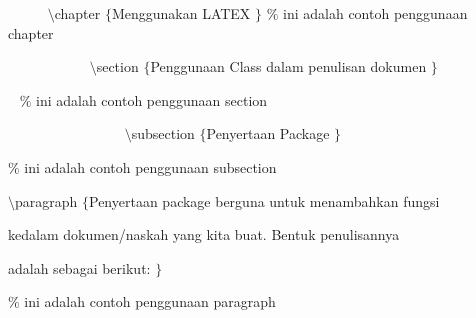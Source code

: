 \begin{itemize}
{\fontsize{10pt}{10pt}\selectfont ~~~~~  $  \setminus  $chapter $  \{  $Menggunakan LATEX $  \}  $  $  \%  $ ini adalah contoh penggunaan chapter}
 \par
{\fontsize{10pt}{10pt}\selectfont ~~~~~~~~~~~  $  \setminus  $section $  \{  $Penggunaan Class dalam penulisan dokumen $  \}  $}
 \par
{\fontsize{10pt}{10pt}\selectfont  \hspace*{0.64in} ~  \hspace*{0.64in}  \hspace*{0.64in}  $  \%  $ ini adalah contoh penggunaan section}
 \par
{\fontsize{10pt}{10pt}\selectfont ~~~~~~~~~~~~~~~~ $  \setminus  $subsection $  \{  $Penyertaan Package $  \}  $  }
 \par
{\fontsize{10pt}{10pt}\selectfont  \hspace*{0.64in}  \hspace*{0.64in}  \hspace*{0.64in}  $  \%  $ ini adalah contoh penggunaan subsection}
 \par
{\fontsize{10pt}{10pt}\selectfont  \hspace*{0.64in}  \hspace*{0.64in}  \hspace*{0.64in}  $  \setminus  $paragraph $  \{  $Penyertaan package berguna untuk menambahkan fungsi }
 \par
{\fontsize{10pt}{10pt}\selectfont  \hspace*{0.64in}  \hspace*{0.64in}  \hspace*{0.64in} kedalam dokumen/naskah yang kita buat. Bentuk penulisannya }
 \par
{\fontsize{10pt}{10pt}\selectfont  \hspace*{0.64in}  \hspace*{0.64in}  \hspace*{0.64in} adalah sebagai berikut: $  \}  $}
 \par
{\fontsize{10pt}{10pt}\selectfont   \hspace*{0.64in}  \hspace*{0.64in}  \hspace*{0.64in}  \hspace*{0.64in}  $  \%  $ ini adalah contoh penggunaan paragraph}
 \par
\end{itemize}
\vspace{10pt}
